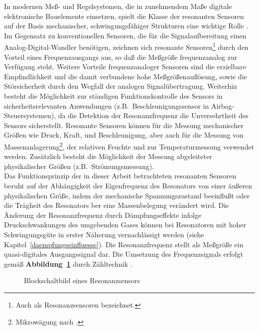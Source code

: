 In modernen Meß- und Regelsystemen, die in zunehmendem Maße digitale
elektronische Bauelemente einsetzen, spielt die Klasse der resonanten
Sensoren auf der Basis mechanischer, schwingungsfähiger Strukturen eine
wichtige Rolle \cite{Bue91b}. Im Gegensatz zu
konventionellen Sensoren, die für die Signalaufbereitung einen
Analog-Digital-Wandler benötigen, zeichnen sich resonante
Sensoren\footnote{Auch als Resonanzsensoren bezeichnet.} durch
den Vorteil eines Frequenzausgangs aus, so daß die Meßgröße
frequenzanalog zur Verfügung steht. Weitere Vorteile frequenzanaloger
Sensoren sind die erzielbare Empfindlichkeit und die damit
verbundene hohe Meßgrößenauflösung, sowie die Störsicherheit durch
den Wegfall der analogen Signalübertragung. Weiterhin besteht
die Möglichkeit zur ständigen Funktionskontrolle des Sensors in
sicherheitsrelevanten Anwendungen (z.B.\ Beschleunigungssensor in
Airbag-Steuersystemen), da die Detektion der Resonanzfrequenz die
Unversehrtheit des Sensors sicherstellt. Resonante
Sensoren können für die Messung mechanischer Größen wie Druck, Kraft,
und Beschleunigung, aber auch für die Messung von
Massenanlagerung\footnote{Mikrowägung nach \cite{Sau59}.},
der relativen Feuchte und zur Temperaturmessung verwendet werden.
Zusätzlich besteht die Möglichkeit der Messung abgeleiteter physikalischer
Größen (z.B.\ Strömungsmessung).\\
Das Funktionsprinzip der in dieser Arbeit betrachteten
resonanten Sensoren beruht auf der Abhängigkeit der Eigenfrequenz
des Resonators von einer äußeren physikalischen Größe, indem der
mechanische Spannungszustand beeinflußt oder die Trägheit des Resonators
ber eine Massenbelegung verändert wird. Die Änderung der
Resonanzfrequenz durch Dämpfungseffekte infolge Druckschwankungen des
umgebenden Gases
können bei Resonatoren mit hoher Schwingungsgüte in erster Näherung
vernachlässigt werden (siehe Kapitel~\ref{daempfungseinfluesse}).
Die Resonanzfrequenz stellt als Meßgröße
ein quasi-digitales Ausgangssignal dar. Die Umsetzung des Frequenzsignals
erfolgt gemäß {\bf Abbildung~\ref{abbprinzip}} durch Zähltechnik
\cite{ABV93}.
\begin{figure}[htb]
\begin{center}

\setresosen
\end{center}
 \caption{\label{abbprinzip}
 Blockschaltbild eines Resonanzsensors}
\end{figure}
